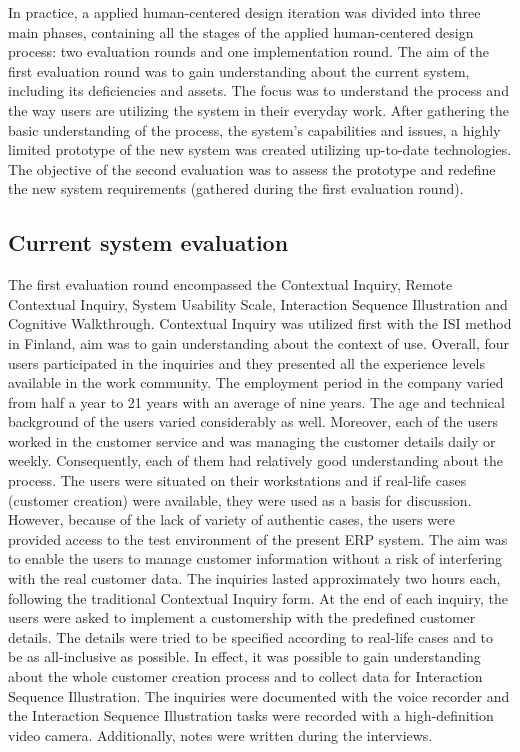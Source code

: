 \documentclass[12pt,a4paper,oneside,pdftex]{report}
\begin{document}
In practice, a applied human-centered design iteration was divided into three main phases, containing all the stages of the applied human-centered design process: two evaluation rounds and one implementation round. The aim of the first evaluation round was to gain understanding about the current system, including its deficiencies and assets. The focus was to understand the process and the way users are utilizing the system in their everyday work. After gathering the basic understanding of the process, the system's capabilities and issues, a highly limited prototype of the new system was created utilizing up-to-date technologies. The objective of the second evaluation was to assess the prototype and redefine the new system requirements (gathered during the first evaluation round). 

\subsection{Current system evaluation}
\label{sec:firstiteration}

The first evaluation round encompassed the Contextual Inquiry, Remote Contextual Inquiry, System Usability Scale, Interaction Sequence Illustration and Cognitive Walkthrough. Contextual Inquiry was utilized first with the ISI method in Finland, aim was to gain understanding about the context of use. Overall, four users participated in the inquiries and they presented all the experience levels available in the work community. The employment period in the company varied from half a year to 21 years with an average of nine years. The age and technical background of the users varied considerably as well. Moreover, each of the users worked in the customer service and was managing the customer details daily or weekly. Consequently, each of them had relatively good understanding about the process. The users were situated on their workstations and if real-life cases (customer creation) were available, they were used as a basis for discussion. However, because of the lack of variety of authentic cases, the users were provided access to the test environment of the present ERP system. The aim was to enable the users to manage customer information without a risk of interfering with the real customer data. The inquiries lasted approximately two hours each, following  the traditional Contextual Inquiry form. At the end of each inquiry, the users were asked to implement a customership with the predefined customer details. The details were tried to be specified according to real-life cases and to be as all-inclusive as possible. In effect, it was possible to gain understanding about the whole customer creation process and to collect data for Interaction Sequence Illustration. The inquiries were documented with the voice recorder and the Interaction Sequence Illustration tasks were recorded with a high-definition video camera. Additionally, notes were written during the interviews.
\end{document}

